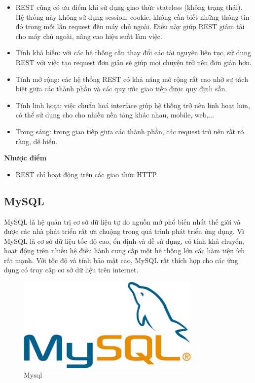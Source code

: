 	        \begin{itemize}
	            \item REST cũng có ưu điểm khi sử dụng giao thức stateless (không trạng thái). Hệ thống này không sử dụng session, cookie, không cần biết những thông tin đó trong mỗi lần request đến máy chủ ngoài. Điều này giúp REST giảm tải cho máy chủ ngoài, nâng cao hiệu suất làm việc.
	            \item Tính khả biến: với các hệ thống cần thay đổi các tài nguyên liên tục, sử dụng REST với việc tạo request đơn giản sẽ giúp mọi chuyện trở nên đơn giản hơn.
	            \item Tính mở rộng: các hệ thống REST có khả năng mở rộng rất cao nhờ sự tách biệt giữa các thành phần và các quy ước giao tiếp được quy định sẵn.
	            \item Tính linh hoạt: việc chuẩn hoá interface giúp hệ thống trở nên linh hoạt hơn, có thể sử dụng cho cho nhiều nền tảng khác nhau, mobile, web,...
	            \item Trong sáng: trong giao tiếp giữa các thành phần, các request trở nên rất rõ ràng, dễ hiểu.
	        \end{itemize}
	        
		    \textbf{Nhược điểm}
		    
	        \begin{itemize}
	            \item REST chỉ hoạt động trên các giao thức HTTP.
	        \end{itemize}
	 
            \subsection{MySQL}
            
            MySQL\cite{MySQL} là hệ quản trị cơ sở dữ liệu tự do nguồn mở phổ biến nhất thế giới và được các nhà phát triển rất ưa chuộng trong quá trình phát triển ứng dụng. Vì MySQL là cơ sở dữ liệu tốc độ cao, ổn định và dễ sử dụng, có tính khả chuyển, hoạt động trên nhiều hệ điều hành cung cấp một hệ thống lớn các hàm tiện ích rất mạnh. Với tốc độ và tính bảo mật cao, MySQL rất thích hợp cho các ứng dụng có truy cập cơ sở dữ liệu trên internet.
            
            \begin{figure}[H]   			\includegraphics[width=0.8\textwidth]{Images/mysqlintro.png}
            	\centering
            	\linebreak
            	\caption{Mysql}
            \end{figure}
            
